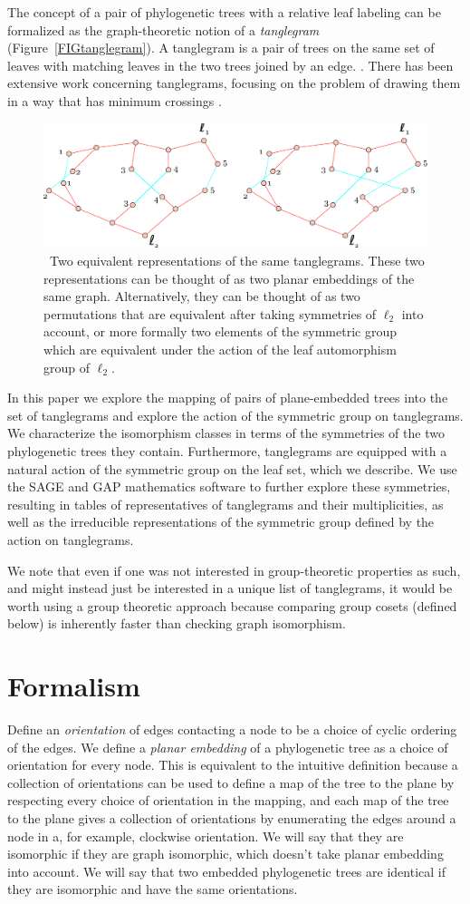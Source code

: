 \documentclass{amsart}
\newcommand{\arxiv}[1]{#1}
\newcommand{\FIGtanglegram}{\
\label{FIGtanglegram}
\begin{figure}
  \arxiv{\includegraphics[width=5in]{figures/relabeling-example}}
\caption{\
  Two equivalent representations of the same tanglegrams.
  These two representations can be thought of as two planar embeddings of the same graph.
  Alternatively, they can be thought of as two permutations that are equivalent after taking symmetries of $\ell_2$ into account, or more formally two elements of the symmetric group which are equivalent under the action of the leaf automorphism group of $\ell_2$.
}
\end{figure}
}
\begin{document}
The concept of a pair of phylogenetic trees with a relative leaf labeling can be formalized as the graph-theoretic notion of a \emph{tanglegram} (Figure~\ref{FIGtanglegram}).
A tanglegram is a pair of trees on the same set of leaves with matching leaves in the two trees joined by an edge. \cite{Venkatachalam2010-zh}.
There has been extensive work concerning tanglegrams, focusing on the problem of drawing them in a way that has minimum crossings \cite{Buchin2008-lc,Lozano2008-tp,Bansal2009-ni,Bocker2009-xl,Fernau2010-an,Venkatachalam2010-zh}.
\FIGtanglegram

In this paper we explore the mapping of pairs of plane-embedded trees into the set of tanglegrams and explore the action of the symmetric group on tanglegrams.
We characterize the isomorphism classes in terms of the symmetries of the two phylogenetic trees they contain.
Furthermore, tanglegrams are equipped with a natural action of the symmetric group on the leaf set, which we describe.
We use the SAGE \cite{SteinJoyner2005} and GAP \cite{GAP4} mathematics software to further explore these symmetries, resulting in tables of representatives of tanglegrams and their multiplicities, as well as the irreducible representations of the symmetric group defined by the action on tanglegrams.

We note that even if one was not interested in group-theoretic properties as such, and might instead just be interested in a unique list of tanglegrams, it would be worth using a group theoretic approach because comparing group cosets (defined below) is inherently faster than checking graph isomorphism.

\section{Formalism}
Define an \emph{orientation} of edges contacting a node to be a choice of cyclic ordering of the edges.
We define a \emph{planar embedding} of a phylogenetic tree as a choice of orientation for every node.
This is equivalent to the intuitive definition because a collection of orientations can be used to define a map of the tree to the plane by respecting every choice of orientation in the mapping, and each map of the tree to the plane gives a collection of orientations by enumerating the edges around a node in a, for example, clockwise orientation.
We will say that they are isomorphic if they are graph isomorphic, which doesn't take planar embedding into account.
We will say that two embedded phylogenetic trees are identical if they are isomorphic and have the same orientations.
\end{document}
